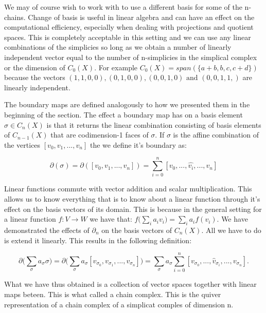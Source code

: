 We may of course wish to work with to use a different basis for some of the n-chains. Change of basis is useful in linear algebra and can have an effect on the computational efficiency, especially when dealing with projections and quotient spaces. This is completely acceptable in this setting and we can use any linear combinations of the simplicies so long as we obtain a number of linearly independent vector equal to the number of n-simplicies in the simplical complex or the dimension of $C_0(X)$. For example $C_0(X) = span(\{a + b, b, c, c + d\})$ because the vectors $(1, 1, 0, 0), (0, 1, 0, 0), (0, 0, 1, 0) \text { and } (0, 0, 1, 1,)$ are linearly independent.

The boundary maps are defined analogously to how we presented them in the beginning of the section. The effect a boundary map has on a basis element $\sigma \in C_n(X)$ is that it returns the linear combination consisting of basis elements of $C_{n-1}(X)$ that are codimension-1 faces of $\sigma$. If $\sigma$ is the affine combination of the vertices $[v_0, v_1, ..., v_n]$ the we define it's boundary as:

$$ \partial(\sigma) = \partial([v_0, v_1, ..., v_n]) = \sum_{i=0}^{n}[v_0, ... , \hat{v_i}, ..., v_n] $$

Linear functions commute with vector addition and scalar multiplication. This allows us to know everything that is to know about a linear function through it's effect on the basis vectors of its domain. This is because in the general setting for a linear function $f : V \to W$ we have that: $ f\big(\sum_{i}{a_iv_i}\big) = \sum_i{a_if(v_i)} $. We have demonstrated the effects of $\partial_n$ on the basis vectors of $C_n(X)$. All we have to do is extend it linearly. This results in the following definition:


$$ \partial\bigg(\sum_{\sigma}a_{\sigma}\sigma\bigg) = \partial\bigg(\sum_{\sigma}{a_{\sigma}[v_{\sigma_0}, v_{\sigma_1}, ..., v_{\sigma_n}]}\bigg) = \sum_{\sigma}{a_{\sigma} \sum_{i=0}^{n}[v_{\sigma_0},..., \hat{v}_{\sigma_i}, ..., v_{\sigma_n}]} .$$

What we have thus obtained is a collection of vector spaces together with linear maps beteen. This is what called a chain complex. This is the quiver representation of a chain complex of a simplicat comples of dimension n.



